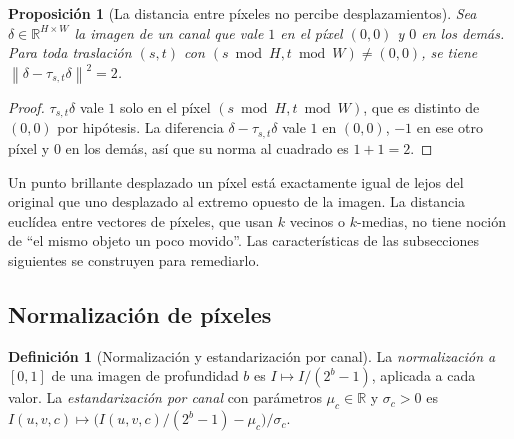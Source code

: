 \documentclass[11pt]{article}
\newtheorem{proposicion}[teorema]{Proposición}
\theoremstyle{definition}
\newtheorem{definicion}[teorema]{Definición}
\theoremstyle{remark}
\newcommand{\R}{\mathbb{R}}
\newcommand{\norm}[1]{\left\lVert #1\right\rVert}
\begin{document}
\begin{proposicion}[La distancia entre píxeles no percibe desplazamientos]\label{prop:dist-pixeles}
\noindent Sea $\delta\in\R^{H\times W}$ la imagen de un canal que vale $1$ en el píxel $(0,0)$ y $0$ en los demás. Para toda traslación $(s,t)$ con $(s\bmod H,t\bmod W)\ne(0,0)$, se tiene $\norm{\delta-\tau_{s,t}\delta}^2=2$.
\end{proposicion}
\begin{proof}
\noindent $\tau_{s,t}\delta$ vale $1$ solo en el píxel $(s\bmod H,t\bmod W)$, que es distinto de $(0,0)$ por hipótesis. La diferencia $\delta-\tau_{s,t}\delta$ vale $1$ en $(0,0)$, $-1$ en ese otro píxel y $0$ en los demás, así que su norma al cuadrado es $1+1=2$.
\end{proof}

\noindent Un punto brillante desplazado un píxel está exactamente igual de lejos del original que uno desplazado al extremo opuesto de la imagen. La distancia euclídea entre vectores de píxeles, que usan $k$ vecinos o $k$-medias, no tiene noción de ``el mismo objeto un poco movido''. Las características de las subsecciones siguientes se construyen para remediarlo.

\subsection{Normalización de píxeles}\label{sec:pixeles}

\begin{definicion}[Normalización y estandarización por canal]\label{def:norm-pix}
\noindent La \emph{normalización a $[0,1]$} de una imagen de profundidad $b$ es $I\mapsto I/(2^b-1)$, aplicada a cada valor. La \emph{estandarización por canal} con parámetros $\mu_c\in\R$ y $\sigma_c>0$ es $I(u,v,c)\mapsto\big(I(u,v,c)/(2^b-1)-\mu_c\big)/\sigma_c$.
\end{definicion}
\end{document}
